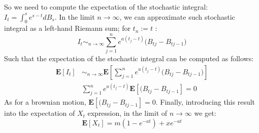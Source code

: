 \documentclass[12pt]{article}
\begin{document}
So we need to compute the expectation of the stochastic integral: $I_t =\int_0^s e^{s-t}dB_s $. In the limit $n\longrightarrow \infty$, we can approximate such stochastic integral as a left-hand Riemann sum; for $t_n := t$ :
\begin{equation}
I_t \sim_{n\longrightarrow \infty} \sum_{j=1}^n e^{a(t_j-t)} \bigg(B_{tj}-B_{tj-1}\bigg)
\end{equation}
Such that the expectation of the stochastic integral can be computed as follows:
\begin{align}
\mathbf{E}[I_t] &\sim_{n\longrightarrow \infty} \mathbf{E}[\sum_{j=1}^n e^{a(t_j-t)} \bigg(B_{tj}-B_{tj-1}\bigg)]  \\
& \sum_{j=1}^n e^{a(t_j-t)} \mathbf{E}[(B_{tj}-B_{tj-1}] = 0
\end{align}
As for a brownian motion, $ \mathbf{E}[(B_{tj}-B_{tj-1}] = 0$. Finally, introducing this result into the expectation of $X_t$ expression, in the limit of $n\longrightarrow \infty$ we get:
\begin{equation}\label{ext}
\boxed{\mathbf{E}[X_t] =m(1-e^{-at}) + x e^{-at} }
\end{equation}
\end{document}
